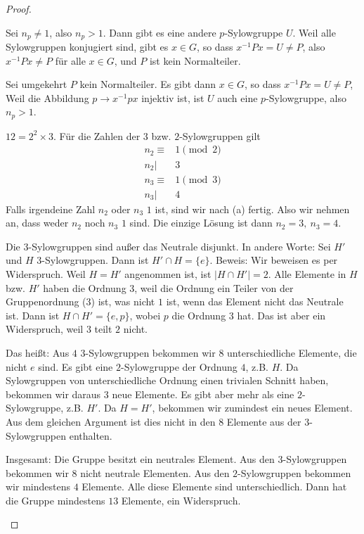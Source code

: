 \begin{proof}
	\begin{parts}
	\item Sei $n_p\neq 1$, also $n_p>1$. Dann gibt es eine andere $p$-Sylowgruppe $U$. Weil alle Sylowgruppen konjugiert sind, gibt es $x\in G$, so dass $x^{-1}Px=U\neq P$, also $x^{-1}Px\neq P$ f\"{u}r alle $x\in G$, und $P$ ist kein Normalteiler.

		Sei umgekehrt $P$ kein Normalteiler. Es gibt dann $x\in G$, so dass $x^{-1}Px=U\neq P$, Weil die Abbildung $p\to x^{-1}px$ injektiv ist, ist $U$ auch eine $p$-Sylowgruppe, also $n_p>1$.
	\item $12=2^2\times 3$. F\"{u}r die Zahlen der $3$ bzw. $2$-Sylowgruppen gilt 
		\begin{align*}
			n_2\equiv& 1\pmod{2}\\
			n_2|&3\\
			n_3\equiv& 1\pmod{3}\\
			n_3|&4
		\end{align*}
		Falls irgendeine Zahl $n_2$ oder $n_3$ $1$ ist, sind wir nach (a) fertig. Also wir nehmen an, dass weder $n_2$ noch $n_3$ $1$ sind. Die einzige Lösung ist dann $n_2=3,~n_3=4$. 

		 Die $3$-Sylowgruppen sind außer das Neutrale disjunkt. In andere Worte: Sei $H'$ und $H$ $3$-Sylowgruppen. Dann ist $H'\cap H=\{e\} $. Beweis: Wir beweisen es per Widerspruch. Weil $H=H'$ angenommen ist, ist $|H\cap H'|=2$. Alle Elemente in $H$ bzw. $H'$ haben die Ordnung $3$, weil die Ordnung ein Teiler von der Gruppenordnung (3) ist, was nicht $1$ ist, wenn das Element nicht das Neutrale ist. Dann ist $H\cap H'=\{e, p\} $, wobei $p$ die Ordnung $3$ hat. Das ist aber ein Widerspruch, weil $3$ teilt $2$ nicht. 

		 Das heißt: Aus $4$ $3$-Sylowgruppen bekommen wir $8$ unterschiedliche Elemente, die nicht $e$ sind. Es gibt eine $2$-Sylowgruppe der Ordnung $4$, z.B. $H$. Da Sylowgruppen von unterschiedliche Ordnung einen trivialen Schnitt haben, bekommen wir daraus $3$ neue Elemente. Es gibt aber mehr als eine $2$-Sylowgruppe, z.B. $H'$. Da $H=H'$, bekommen wir zumindest ein neues Element. Aus dem gleichen Argument ist dies nicht in den $8$ Elemente aus der $3$-Sylowgruppen enthalten.

		 Insgesamt: Die Gruppe besitzt ein neutrales Element. Aus den $3$-Sylowgruppen bekommen wir $8$ nicht neutrale Elementen. Aus den $2$-Sylowgruppen bekommen wir mindestens $4$ Elemente. Alle diese Elemente sind unterschiedlich. Dann hat die Gruppe mindestens $13$ Elemente, ein Widerspruch.\qedhere
	\end{parts}
\end{proof}
